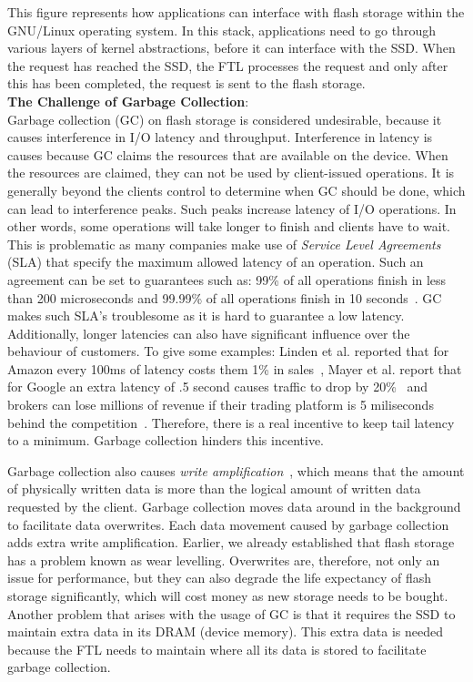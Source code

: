 This figure represents how applications can interface with flash storage within the GNU/Linux operating system. In this stack, applications need to go through various layers of kernel abstractions, before it can interface with the SSD. When the request has reached the SSD, the FTL processes the request and only after this has been completed, the request is sent to the flash storage.\\
\textbf{The Challenge of Garbage Collection}:\\
Garbage collection (GC) on flash storage is considered undesirable, because it causes interference in I/O latency and throughput. Interference in latency is causes because GC claims the resources that are available on the device. When the resources are claimed, they can not be used by client-issued operations. It is generally beyond the clients control to determine when GC should be done, which can lead to interference peaks. Such peaks increase latency of I/O operations. In other words, some operations will take longer to finish and clients have to wait. This is problematic as many companies make use of \textit{Service Level Agreements} (SLA) that specify the maximum allowed latency of an operation. Such an agreement can be set to guarantees such as: 99\% of all operations finish in less than 200 microseconds and 99.99\% of all operations finish in 10 seconds~\cite{lersch2020enabling}. GC makes such SLA's troublesome as it is hard to guarantee a low latency. Additionally, longer latencies can also have significant influence over the behaviour of customers. To give some examples: Linden et al. reported that for Amazon every 100ms of latency costs them 1\% in sales~\cite{hoff2009cost,linden2006}, Mayer et al. report that for Google an extra latency of .5 second causes traffic to drop by 20\%~\cite{hoff2009cost,mayer2006} and brokers can lose millions of revenue if their trading platform is 5 miliseconds behind the competition~\cite{hoff2009cost}. Therefore, there is a real incentive to keep tail latency to a minimum. Garbage collection hinders this incentive.

Garbage collection also causes \textit{write amplification}~\cite{yang2014garbage}, which means that the amount of physically written data is more than the logical amount of written data requested by the client. Garbage collection moves data around in the background to facilitate data overwrites. Each data movement caused by garbage collection adds extra write amplification. Earlier, we already established that flash storage has a problem known as wear levelling. Overwrites are, therefore, not only an issue for performance, but they can also degrade the life expectancy of flash storage significantly, which will cost money as new storage needs to be bought. Another problem that arises with the usage of GC is that it requires the SSD to maintain extra data in its DRAM (device memory). This extra data is needed because the FTL needs to maintain where all its data is stored to facilitate garbage collection.

